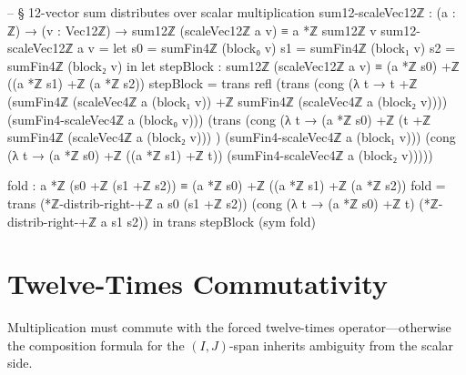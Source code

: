 \documentclass[11pt,a4paper]{book}
\begin{document}
\begin{code}
-- § 12-vector sum distributes over scalar multiplication
sum12-scaleVec12ℤ : (a : ℤ) → (v : Vec12ℤ) → sum12ℤ (scaleVec12ℤ a v) ≡ a *ℤ sum12ℤ v
sum12-scaleVec12ℤ a v =
  let
    s0 = sumFin4ℤ (block₀ v)
    s1 = sumFin4ℤ (block₁ v)
    s2 = sumFin4ℤ (block₂ v)
  in
  let
    stepBlock : sum12ℤ (scaleVec12ℤ a v) ≡ (a *ℤ s0) +ℤ ((a *ℤ s1) +ℤ (a *ℤ s2))
    stepBlock =
      trans
        refl
        (trans
          (cong
            (λ t → t +ℤ (sumFin4ℤ (scaleVec4ℤ a (block₁ v)) +ℤ sumFin4ℤ (scaleVec4ℤ a (block₂ v))))
            (sumFin4-scaleVec4ℤ a (block₀ v)))
          (trans
            (cong
              (λ t → (a *ℤ s0) +ℤ (t +ℤ sumFin4ℤ (scaleVec4ℤ a (block₂ v))) )
              (sumFin4-scaleVec4ℤ a (block₁ v)))
            (cong
              (λ t → (a *ℤ s0) +ℤ ((a *ℤ s1) +ℤ t))
              (sumFin4-scaleVec4ℤ a (block₂ v)))))

    fold : a *ℤ (s0 +ℤ (s1 +ℤ s2)) ≡ (a *ℤ s0) +ℤ ((a *ℤ s1) +ℤ (a *ℤ s2))
    fold =
      trans
        (*ℤ-distrib-right-+ℤ a s0 (s1 +ℤ s2))
        (cong (λ t → (a *ℤ s0) +ℤ t) (*ℤ-distrib-right-+ℤ a s1 s2))
  in
  trans stepBlock (sym fold)
\end{code}

\section{Twelve-Times Commutativity}

Multiplication must commute with the forced twelve-times
operator---otherwise the composition formula for
the $(I,J)$-span inherits ambiguity from the scalar side.
\end{document}
